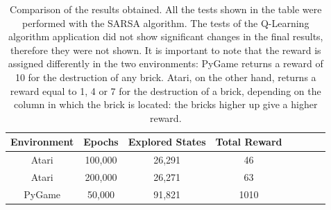 \begin{table}[h]
	\centering
	\begin{tabular}{*{8}{c}}
		Environment & Epochs & Explored States & Total Reward \\
		\hline
		Atari & 100,000 & 26,291 & 46 \\
		Atari & 200,000 & 26,271 & 63 \\
		\hline
		PyGame & 50,000 & 91,821 & 1010 \\
	\end{tabular}
	\caption{Comparison of the results obtained. All the tests shown in the table were performed with the SARSA algorithm. The tests of the Q-Learning algorithm application did not show significant changes in the final results, therefore they were not shown. It is important to note that the reward is assigned differently in the two environments: PyGame returns a reward of 10 for the destruction of any brick. Atari, on the other hand, returns a reward equal to 1, 4 or 7 for the destruction of a brick, depending on the column in which the brick is located: the bricks higher up give a higher reward.}
\end{table}

